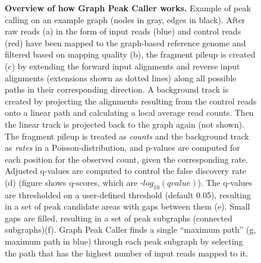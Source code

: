 \documentclass[10pt,letterpaper]{article}
\begin{document}
\begin{figure}

 
   \caption{{\bf Overview of how Graph Peak Caller works.} Example of peak calling on an example graph (nodes in gray, edges in black). After raw reads (a) in the form of input reads (blue) and control reads (red) have been mapped to the graph-based reference genome and filtered based on mapping quality (b), the fragment pileup is created (c) by extending the forward input alignments and reverse input alignments (extensions shown as dotted lines) along all possible paths in their corresponding direction.
     A background track is created by projecting the alignments resulting from the control reads onto a linear path and calculating a local average read counts.
     Then the linear track is projected back to the graph again (not shown).
     The fragment pileup is treated as \emph{counts} and the background track as \emph{rates} in a Poisson-distribution, and p-values are computed for each position for the observed count, given the corresponding rate.
     Adjusted q-values are computed to control the false discovery rate (d) (figure shows q-scores, which are -$log_{10}(qvalue)$). The q-values are thresholded on a user-defined threshold (default 0.05), resulting in a set of peak candidate areas with gaps between them (e). Small gaps are filled, resulting in a set of peak subgraphs (connected subgraphs)(f). Graph Peak Caller finds a single “maximum path” (g, maximum path in blue) through each peak subgraph by selecting the path that has the highest number of input reads mapped to it. }
   \label{overview_figure}


\end{figure}
\end{document}
